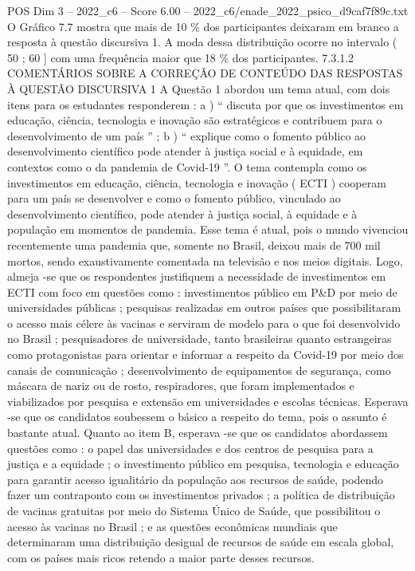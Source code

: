 \begin{textsample}{POS Dim 3 – 2022\_c6 – Score 6.00 – 2022\_c6/enade\_2022\_psico\_d9caf7f89c.txt}
O Gráfico 7.7 mostra que mais de 10 \% dos participantes deixaram em branco a resposta à questão discursiva 1.
A moda dessa distribuição ocorre no intervalo ( 50 ; 60 ] com uma frequência maior que 18 \% dos participantes. 7.3.1.2 COMENTÁRIOS SOBRE A CORREÇÃO DE CONTEÚDO DAS RESPOSTAS À QUESTÃO DISCURSIVA 1 A Questão 1 abordou um tema atual, com dois itens para os estudantes responderem : a ) “ discuta por que os investimentos em educação, ciência, tecnologia e inovação são estratégicos e contribuem para o desenvolvimento de um país ” ; b ) “ explique como o fomento público ao desenvolvimento científico pode atender à justiça social e à equidade, em contextos como o da pandemia de Covid-19 ”.
O tema contempla como os investimentos em educação, ciência, tecnologia e inovação ( ECTI ) cooperam para um país se desenvolver e como o fomento público, vinculado ao desenvolvimento científico, pode atender à justiça social, à equidade e à população em momentos de pandemia.
Esse tema é atual, pois o mundo vivenciou recentemente uma pandemia que, somente no Brasil, deixou mais de 700 mil mortos, sendo exaustivamente comentada na televisão e nos meios digitais.
Logo, almeja -se que os respondentes justifiquem a necessidade de investimentos em ECTI com foco em questões como : investimentos público em P\&D por meio de universidades públicas ; pesquisas realizadas em outros países que possibilitaram o acesso mais célere às vacinas e serviram de modelo para o que foi desenvolvido no Brasil ; pesquisadores de universidade, tanto brasileiras quanto estrangeiras como protagonistas para orientar e informar a respeito da Covid-19 por meio dos canais de comunicação ; desenvolvimento de equipamentos de segurança, como máscara de nariz ou de rosto, respiradores, que foram implementados e viabilizados por pesquisa e extensão em universidades e escolas técnicas.
Esperava -se que os candidatos soubessem o básico a respeito do tema, pois o assunto é bastante atual.
Quanto ao item B, esperava -se que os candidatos abordassem questões como : o papel das universidades e dos centros de pesquisa para a justiça e a equidade ; o investimento público em pesquisa, tecnologia e educação para garantir acesso igualitário da população aos recursos de saúde, podendo fazer um contraponto com os investimentos privados ; a política de distribuição de vacinas gratuitas por meio do Sistema Único de Saúde, que possibilitou o acesso às vacinas no Brasil ; e as questões econômicas mundiais que determinaram uma distribuição desigual de recursos de saúde em escala global, com os países mais ricos retendo a maior parte desses recursos.

\end{textsample}
